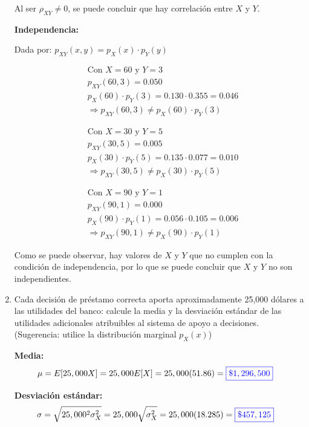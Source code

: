 \documentclass[12pt]{report}
\newcommand{\linejump}{\hfill \break}
\begin{document}
\begin{enumerate}
    Al ser $\rho_{XY} \neq 0$, se puede concluir que {\color{blue}hay correlación} entre $X$ y $Y$.

    \linejump
    \textbf{Independencia:}

    Dada por: $p_{XY}(x, y) = p_X(x) \cdot p_Y(y)$
    
    \begin{align*}
      &\text{Con } X = 60 \text{ y } Y = 3 \\
      &p_{XY}(60, 3) = 0.050 \\
      &p_X(60) \cdot p_Y(3) = 0.130 \cdot 0.355 = 0.046 \\
      &\Rightarrow p_{XY}(60, 3) \neq p_X(60) \cdot p_Y(3)
    \end{align*}

    \begin{align*}
      &\text{Con } X = 30 \text{ y } Y = 5 \\
      &p_{XY}(30, 5) = 0.005 \\
      &p_X(30) \cdot p_Y(5) = 0.135 \cdot 0.077 = 0.010 \\
      &\Rightarrow p_{XY}(30, 5) \neq p_X(30) \cdot p_Y(5)
    \end{align*}

    \begin{align*}
      &\text{Con } X = 90 \text{ y } Y = 1 \\
      &p_{XY}(90, 1) = 0.000 \\
      &p_X(90) \cdot p_Y(1) = 0.056 \cdot 0.105 = 0.006 \\
      &\Rightarrow p_{XY}(90, 1) \neq p_X(90) \cdot p_Y(1)
    \end{align*}

    Como se puede observar, hay valores de $X$ y $Y$ que no cumplen con la condición de independencia, por lo que se puede concluir que $X$ y $Y$ {\color{blue}no son independientes.} \\

    \item Cada decisión de préstamo correcta aporta aproximadamente 25,000 dólares a las utilidades del banco: calcule la media y la desviación estándar de las utilidades adicionales atribuibles al sistema de apoyo a decisiones. (Sugerencia: utilice la distribución marginal $p_X(x)$)
    
    \textbf{Media:}
    \begin{align*}
      \mu = E[25,000X] &= 25,000E[X] = 25,000(51.86) = {\color{blue}\boxed{\$1,296,500}}
    \end{align*}

    \linejump
    \textbf{Desviación estándar:}
    \begin{align*}
      \sigma = \sqrt{25,000^2 \sigma_X^2} &= 25,000\sqrt{\sigma_X^2} = 25,000(18.285) = {\color{blue}\boxed{\$457,125}}
    \end{align*}
  \end{enumerate}
\end{document}
